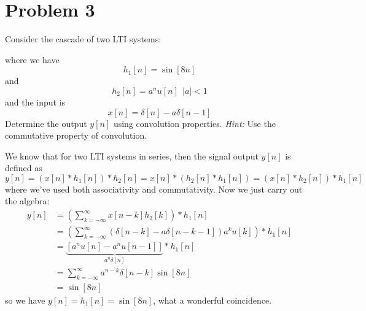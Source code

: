 \documentclass[10pt]{article}
\begin{document}
	\section*{Problem 3}
	Consider the cascade of two LTI systems:
	\begin{center}
	\end{center}
		where we have 
		\[
			h_1[n] = \sin[8n]
		\] 
		and 
		\[
			h_2[n] = a^{n}u[n] \ \ |a| < 1
		\] 
		and the input is
		\[
			x[n] = \delta[n] - a \delta[n - 1] 
		\] 
		Determine the output \( y[n] \) using convolution properties. \textit{Hint:} Use the commutative property of 
		convolution.

		\begin{solution}
			We know that for two LTI systems in series, then the signal output  \( y[n] \) is defined as 
			\[
				y[n] = (x[n] * h_1[n]) * h_2[n] = x[n] * (h_2[n] * h_1[n]) = (x[n] * h_2[n]) * h_1[n]
			\] 
			where we've used both associativity and commutativity. Now we just carry out the algebra: 
			\begin{align*}
				y[n] &= \left( \sum_{k = -\infty}^{\infty}x[n - k] h_2[k] \right) *h_1[n] \\
					 &= \left( \sum_{k = -\infty}^{\infty}(\delta[n - k] - a\delta[n - k - 1]) a^{k}u[k] \right) *h_1[n] \\
					 &= \underbrace{\left[ a^{n}u[n] - a^{n}u[n -1] \right]}_{a^{n}\delta[n]} * h_1[n]  \\
					 &= \sum_{k = -\infty}^{\infty}a^{n - k}\delta[n - k] \sin[8n] \\
					 &= \sin[8n] 
			\end{align*}
			so we have \( y[n] = h_1[n] = \sin[8n] \), what a wonderful coincidence. 
		\end{solution}
	\pagebreak
\end{document}
